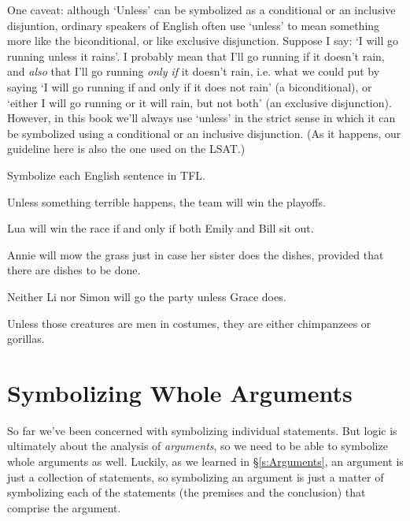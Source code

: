 One caveat: although `Unless' can be symbolized as a conditional or an inclusive disjuntion, ordinary speakers of English often use `unless' to mean something more like the biconditional, or like exclusive disjunction. Suppose I say: `I will go running unless it rains'. I probably mean that I'll go running if it doesn't rain, and \emph{also} that I'll go running \emph{only if} it doesn't rain, i.e.  what we could put by saying `I will go running if and only if it does not rain' (a biconditional), or  `either I will go running or it will rain, but not both' (an exclusive disjunction). However, in this book we'll always use `unless' in the strict sense in which it can be symbolized using a conditional or an inclusive disjunction.  (As it happens, our guideline here is also the one used on the LSAT.)

\practiceproblems
\problempart Symbolize each English sentence in TFL.

\begin{earg}
\item Unless something terrible happens, the team will win the playoffs.
\item Lua will win the race if and only if both Emily and Bill sit out.
\item Annie will mow the grass just in case her sister does the dishes, provided that there are dishes to be done.
\item Neither Li nor Simon will go the party unless Grace does.
\item Unless those creatures are men in costumes, they are either chimpanzees or gorillas.

\end{earg}



\section{Symbolizing Whole Arguments}

So far we've been concerned with symbolizing individual statements.  But logic is ultimately about the analysis of \emph{arguments}, so we need to be able to symbolize  whole arguments as well.  Luckily, as we learned in \S\ref{s:Arguments}, an argument is just a collection of statements, so symbolizing an argument is just a matter of symbolizing each of the statements (the premises and the conclusion) that comprise the argument.


